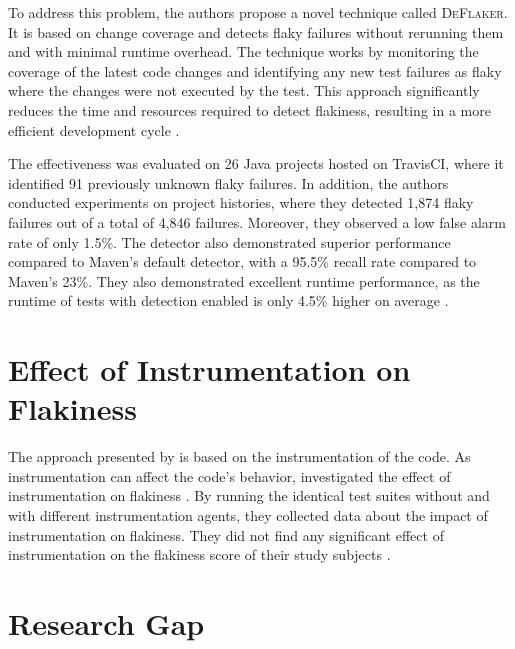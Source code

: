To address this problem, the authors propose a novel technique called \textsc{DeFlaker}.
It is based on change coverage and detects flaky failures without rerunning them and with minimal runtime overhead.
The technique works by monitoring the coverage of the latest code changes and identifying any new test failures as flaky where the changes were not executed by the test.
This approach significantly reduces the time and resources required to detect flakiness, resulting in a more efficient development cycle \autocite{bell_deflaker_2018}.

The effectiveness was evaluated on 26 Java projects hosted on TravisCI, where it identified 91 previously unknown flaky failures.
In addition, the authors conducted experiments on project histories, where they detected 1,874 flaky failures out of a total of 4,846 failures.
Moreover, they observed a low false alarm rate of only 1.5\%.
The detector also demonstrated superior performance compared to Maven's default detector, with a 95.5\% recall rate compared to Maven's 23\%.
They also demonstrated excellent runtime performance, as the runtime of tests with detection enabled is only 4.5\% higher on average \autocite{bell_deflaker_2018}.

\section{Effect of Instrumentation on Flakiness}
The approach presented by \citeauthor*{bell_deflaker_2018} is based on the instrumentation of the code.
As instrumentation can affect the code's behavior, \citeauthor*{rasheed_effect_2023} investigated the effect of instrumentation on flakiness \autocite{rasheed_effect_2023}.
By running the identical test suites without and with different instrumentation agents, they collected data about the impact of instrumentation on flakiness.
They did not find any significant effect of instrumentation on the flakiness score of their study subjects \autocite{rasheed_effect_2023}.


\section{Research Gap}

